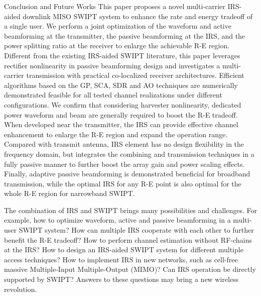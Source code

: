 \documentclass[journal]{IEEEtran}
\begin{document}
	\begin{section}{Conclusion and Future Works}\label{se:conclusion_and_future_works}
		This paper proposes a novel multi-carrier IRS-aided downlink MISO SWIPT system to enhance the rate and energy tradeoff of a single user. We perform a joint optimization of the waveform and active beamforming at the transmitter, the passive beamforming at the IRS, and the power splitting ratio at the receiver to enlarge the achievable R-E region. Different from the existing IRS-aided SWIPT literature, this paper leverages rectifier nonlinearity in passive beamforming design and investigates a multi-carrier transmission with practical co-localized receiver architectures. Efficient algorithms based on the GP, SCA, SDR and AO techniques are numerically demonstrated feasible for all tested channel realizations under different configurations. We confirm that considering harvester nonlinearity, dedicated power waveform and beam are generally required to boost the R-E tradeoff. When developed near the transmitter, the IRS can provide effective channel enhancement to enlarge the R-E region and expand the operation range. Compared with transmit antenna, IRS element has no design flexibility in the frequency domain, but integrates the combining and transmission techniques in a fully passive manner to further boost the array gain and power scaling effects. Finally, adaptive passive beamforming is demonstrated beneficial for broadband transmission, while the optimal IRS for any R-E point is also optimal for the whole R-E region for narrowband SWIPT.

		The combination of IRS and SWIPT brings many possibilities and challenges. For example, how to optimize waveform, active and passive beamforming in a multi-user SWIPT system? How can multiple IRS cooperate with each other to further benefit the R-E tradeoff? How to perform channel estimation without RF-chains at the IRS? How to design an IRS-aided SWIPT system for different multiple access techniques? How to implement IRS in new networks, such as cell-free massive Multiple-Input Multiple-Output (MIMO)? Can IRS operation be directly supported by SWIPT? Answers to these questions may bring a new wireless revolution.
	\end{section}


	
	
\end{document}
